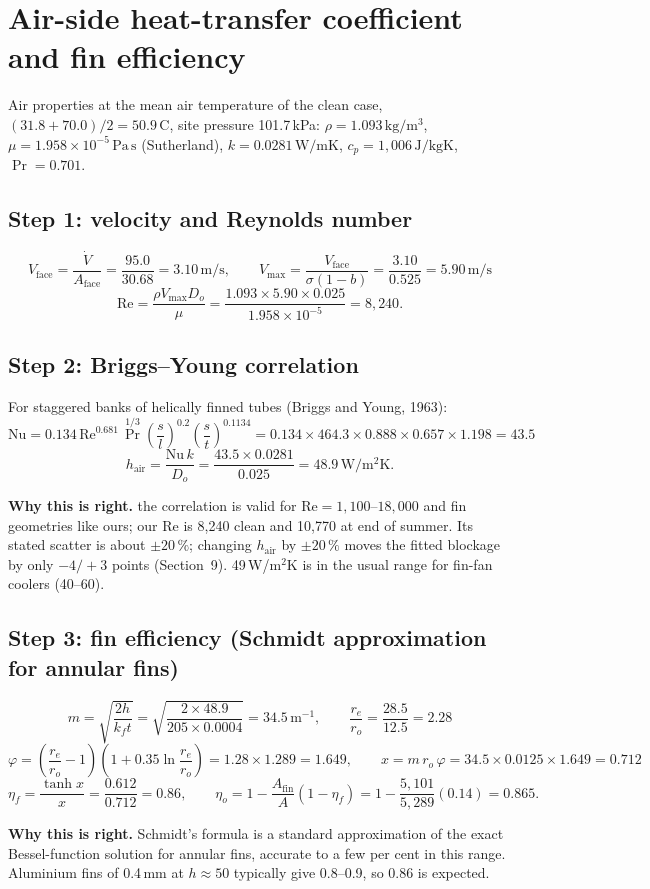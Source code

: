 \documentclass[11pt,a4paper]{article}
\newcommand{\unit}[1]{\ensuremath{\,\mathrm{#1}}}
\newcommand{\why}[1]{\par\noindent\textbf{Why this is right.} #1\par}
\begin{document}
\section{Air-side heat-transfer coefficient and fin efficiency}

Air properties at the mean air temperature of the clean case, $(31.8+70.0)/2 = 50.9\,$\textdegree C, site pressure 101.7\,kPa: $\rho=1.093\unit{kg/m^3}$, $\mu = 1.958\times10^{-5}\unit{Pa\,s}$ (Sutherland), $k=0.0281\unit{W/mK}$, $c_p=1{,}006\unit{J/kgK}$, $\Pr=0.701$.

\subsection*{Step 1: velocity and Reynolds number}
\[
V_\text{face} = \frac{\dot V}{A_\text{face}} = \frac{95.0}{30.68} = 3.10\unit{m/s},\qquad
V_\text{max} = \frac{V_\text{face}}{\sigma(1-b)} = \frac{3.10}{0.525} = 5.90\unit{m/s}
\]
\[
\mathrm{Re} = \frac{\rho V_\text{max} D_o}{\mu} = \frac{1.093\times5.90\times0.025}{1.958\times10^{-5}} = 8{,}240.
\]

\subsection*{Step 2: Briggs--Young correlation}
For staggered banks of helically finned tubes (Briggs and Young, 1963):
\[
\mathrm{Nu} = 0.134\,\mathrm{Re}^{0.681}\,\Pr^{1/3}\left(\frac{s}{l}\right)^{0.2}\left(\frac{s}{t}\right)^{0.1134}
= 0.134\times464.3\times0.888\times0.657\times1.198 = 43.5
\]
\[
h_\text{air} = \frac{\mathrm{Nu}\,k}{D_o} = \frac{43.5\times0.0281}{0.025} = 48.9\unit{W/m^2K}.
\]
\why{the correlation is valid for $\mathrm{Re}=1{,}100$--$18{,}000$ and fin geometries like ours; our Re is 8{,}240 clean and 10{,}770 at end of summer. Its stated scatter is about $\pm20\,\%$; changing $h_\text{air}$ by $\pm20\,\%$ moves the fitted blockage by only $-4/+3$ points (Section~9). 49\,W/m$^2$K is in the usual range for fin-fan coolers (40--60).}

\subsection*{Step 3: fin efficiency (Schmidt approximation for annular fins)}
\[
m = \sqrt{\frac{2h}{k_f t}} = \sqrt{\frac{2\times48.9}{205\times0.0004}} = 34.5\unit{m^{-1}},\qquad
\frac{r_e}{r_o} = \frac{28.5}{12.5} = 2.28
\]
\[
\varphi = \left(\frac{r_e}{r_o}-1\right)\left(1+0.35\ln\frac{r_e}{r_o}\right) = 1.28\times1.289 = 1.649,\qquad
x = m\,r_o\,\varphi = 34.5\times0.0125\times1.649 = 0.712
\]
\[
\eta_f = \frac{\tanh x}{x} = \frac{0.612}{0.712} = 0.86,\qquad
\eta_o = 1-\frac{A_\text{fin}}{A}(1-\eta_f) = 1-\frac{5{,}101}{5{,}289}(0.14) = 0.865.
\]
\why{Schmidt's formula is a standard approximation of the exact Bessel-function solution for annular fins, accurate to a few per cent in this range. Aluminium fins of 0.4\,mm at $h\approx50$ typically give 0.8--0.9, so 0.86 is expected.}
\end{document}
